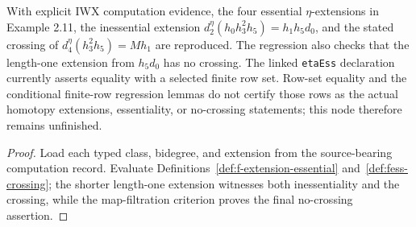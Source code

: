 \begin{proposition}
  \label{prop:eta-ess-regression}
  \notready
  With explicit IWX computation evidence, the four essential
  $\eta$-extensions in Example 2.11, the inessential extension
  $d_2^\eta(h_0h_3^2h_5)=h_1h_5d_0$, and the stated crossing of
  $d_4^\eta(h_3^2h_5)=Mh_1$ are reproduced.  The regression also checks that
  the length-one extension from $h_5d_0$ has no crossing.
  The linked \texttt{etaEss} declaration currently asserts equality with a
  selected finite row set.  Row-set equality and the conditional finite-row
  regression lemmas do not certify those rows as the actual homotopy
  extensions, essentiality, or no-crossing statements; this node therefore
  remains unfinished.
\end{proposition}

\begin{proof}
  Load each typed class, bidegree, and extension from the source-bearing
  computation record.  Evaluate Definitions~\ref{def:f-extension-essential}
  and~\ref{def:fess-crossing}; the shorter length-one extension witnesses both
  inessentiality and the crossing, while the map-filtration criterion proves
  the final no-crossing assertion.
\end{proof}
